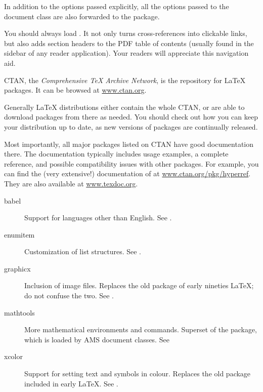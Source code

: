 In addition to the options passed explicitly,
all the options passed to the document class are also forwarded to the package.

\begin{practices}
You should always load .
It not only turns cross-references into clickable links,
but also adds section headers to the PDF table of contents
(usually found in the sidebar of any reader application).
Your readers will appreciate this navigation aid.
\end{practices}

CTAN, the \emph{Comprehensive \TeX{} Archive Network},
is the repository for \LaTeX{} packages.
It can be browsed at \url{www.ctan.org}.

Generally \LaTeX{} distributions either contain the whole CTAN,
or are able to download packages from there as needed.
You should check out how you can keep your distribution up to date,
as new versions of packages are continually released.

Most importantly, all major packages listed on CTAN have good documentation there.
The documentation typically includes usage examples, a complete reference,
and possible compatibility issues with other packages.
For example, you can find the (very extensive!) documentation of 
at \url{www.ctan.org/pkg/hyperref}.
They are also available at \url{www.texdoc.org}.

\begin{description}
\item[babel] Support for languages other than English.
    See .
\item[enumitem] Customization of list structures.
    See .
\item[graphicx] Inclusion of image files.
    Replaces the old  package of early nineties \LaTeX{};
    do not confuse the two.
    See .
\item[mathtools] More mathematical environments and commands.
    Superset of the  package, which is loaded by AMS document classes.
    See 
\item[xcolor] Support for setting text and symbols in colour.
    Replaces the old  package included in early \LaTeX{}.
    See .
\end{description}


